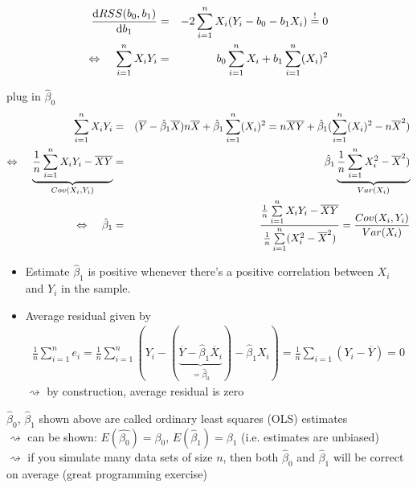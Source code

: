 \documentclass[11pt,a4paper,numbers=endperiod]{scrartcl}
\newcommand{\id}{\hspace*{4mm}}
\newcommand{\dif}{\mathrm{d}}
\begin{document}
\begin{eqnarray*}
	\frac{\dif RSS(b_0, b_1)}{\dif b_1} &=& -2 \sum\limits_{i = 1}^n X_i (Y_i - b_0 - b_1 X_i)\overset{!}{=} 0\\
	\Leftrightarrow \id \sum\limits_{i = 1}^n X_i Y_i &=& b_0  \sum\limits_{i = 1}^n X_i + b_1 \sum\limits_{i = 1}^n (X_i)^2\\
\end{eqnarray*}
{plug in $\hat{\beta}_0$
\begin{eqnarray*}
	\sum\limits_{i = 1}^n X_i Y_i &=& (\overline{Y} - \hat{\beta}_1 \overline{X}) n \overline{X} +  \hat{\beta}_1 \sum\limits_{i = 1}^n (X_i)^2 = n \overline{X} \overline{Y} + \hat{\beta}_1 (\sum\limits_{i = 1}^n (X_i)^2 - n \overline{X}^2)\\
	\Leftrightarrow \id \underbrace{\frac{1}{n} \sum\limits_{i = 1}^n X_iY_i - \overline{X} \overline{Y}}_{Cov(X_i, Y_i)} &=& \hat{\beta}_1 \underbrace{\frac{1}{n} \sum\limits_{i = 1}^n X_i^2 - \overline{X}^2)}_{Var(X_i)}\\
	\Leftrightarrow \id \hat{\beta}_1 &=& \frac{\frac{1}{n} \sum\limits_{i = 1}^n X_i Y_i - \overline{X} \overline{Y}}{\frac{1}{n} \sum\limits_{i = 1}^n (X_i^2 - \overline{X}^2)} = \frac{Cov(X_i, Y_i)}{Var(X_i)}
\end{eqnarray*}

\begin{itemize}
	\item Estimate $\hat{\beta}_1$ is positive whenever there's a positive correlation between $X_i$ and $Y_i$ in the sample.
	\item Average residual given by \begin{align*}
		\frac{1}{n} \sum\limits_{i = 1}^n e_i = \frac{1}{n} \sum\limits_{i = 1}^n (Y_i - (\underbrace{\overline{Y} - \hat{\beta}_1 \overline{X}_i}_{= \hat{\beta}_0}) - \hat{\beta}_1 X_i) = \frac{1}{n} \sum\limits_{i = 1} (Y_i - \overline{Y}) = 0
	\end{align*}
	$\rightsquigarrow$ by construction, average residual is zero
\end{itemize}
$\hat{\beta}_0$, $\hat{\beta}_1$ shown above are called ordinary least squares (OLS) estimates\\
$\rightsquigarrow$ can be shown: $E(\hat{\beta_0}) = \beta_0$, $E(\hat{\beta}_1) = \beta_1$ (i.e. estimates are unbiased)\\
$\rightsquigarrow$ if you simulate many data sets of size $n$, then both $\hat{\beta}_0$ and $\hat{\beta}_1$ will be correct on average (great programming exercise)\\

}
\end{document}
